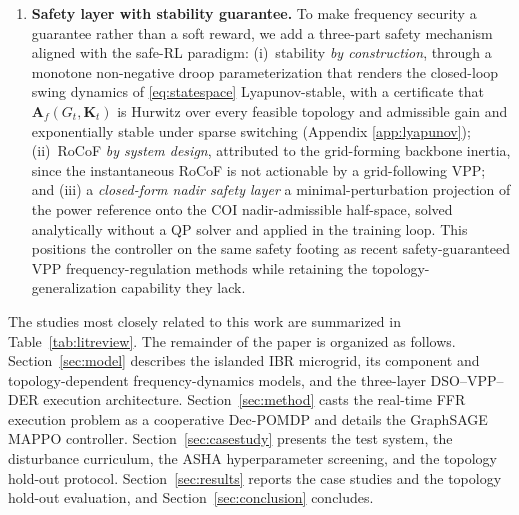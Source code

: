 \documentclass[lettersize,journal]{IEEEtran}
\begin{document}
\begin{enumerate}[leftmargin=*]
  \item \textbf{Safety layer with stability guarantee.}
        To make frequency security a guarantee rather than a soft reward, we add a three-part safety mechanism aligned with the safe-RL paradigm: (i)~stability \emph{by construction},
        through a monotone non-negative droop parameterization that renders the closed-loop swing dynamics of \eqref{eq:statespace} Lyapunov-stable, with a certificate that $\mathbf{A}_f(G_t,\mathbf{K}_t)$ is Hurwitz over every
        feasible topology and admissible gain and exponentially stable under sparse switching (Appendix \ref{app:lyapunov}); (ii)~RoCoF \emph{by system design}, attributed to the
        grid-forming backbone inertia, since the instantaneous RoCoF is not actionable by a grid-following VPP; and (iii) a \emph{closed-form nadir safety layer} a minimal-perturbation
        projection of the power reference onto the COI nadir-admissible half-space, solved analytically without a QP solver and applied in the training loop. This positions the controller on the same safety footing as recent safety-guaranteed VPP
        frequency-regulation methods while retaining the topology-generalization capability they lack.

\end{enumerate}

The studies most closely related to this work are summarized in Table~\ref{tab:litreview}. The remainder of the paper is organized as follows. Section~\ref{sec:model} describes the islanded IBR microgrid, its component and topology-dependent frequency-dynamics models, and the three-layer DSO--VPP--DER execution architecture. Section~\ref{sec:method} casts the real-time FFR execution problem as a cooperative Dec-POMDP and details the GraphSAGE MAPPO controller. Section~\ref{sec:casestudy} presents the test system, the disturbance curriculum, the ASHA hyperparameter screening, and the topology hold-out protocol. Section~\ref{sec:results} reports the case studies and the topology hold-out evaluation, and Section~\ref{sec:conclusion} concludes.
\end{document}
